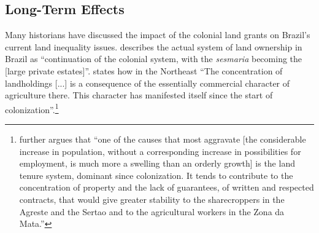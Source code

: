 \documentclass[11pt]{article}
\begin{document}






\subsection{Long-Term Effects}

Many historians have discussed the impact of the colonial land grants on Brazil's current land inequality issues.
\textcite[p.~18]{Andrade1980-zd} describes the actual system of land ownership in Brazil as ``continuation of the colonial system, with the \textit{sesmaria} becoming the [large private estates]''.
\textcite[p.~36]{De_Oliveira_Andrade1980-xz} states how in the Northeast 
``The concentration of landholdings [...] is a consequence of the essentially commercial character of agriculture there. This character has manifested itself since the start of colonization''.\footnote{\textcite[p.~34-35]{De_Oliveira_Andrade1980-xz} further argues that 
``one of the causes that most aggravate [the considerable increase in population, without a corresponding increase in possibilities for employment, is much more a swelling than an orderly growth] is the land tenure system, dominant since colonization. It tends to contribute to the concentration of property and the lack of guarantees, of written and respected contracts, that would give greater stability to the sharecroppers in the Agreste and the Sertao and to the agricultural workers in the Zona da Mata.''}
\end{document}
